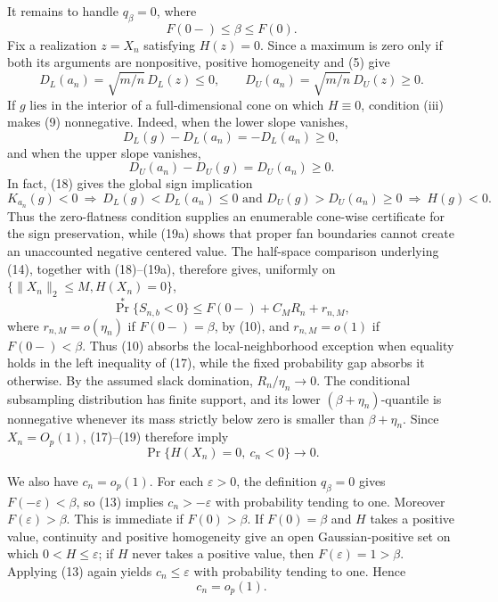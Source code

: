 It remains to handle \(q_\beta=0\), where
\[
F(0-)\leq\beta\leq F(0).
\tag{17}
\]
Fix a realization \(z=X_n\) satisfying \(H(z)=0\).  Since a maximum is zero only if both its arguments are nonpositive, positive homogeneity and (5) give
\[
D_L(a_n)=\sqrt{m/n}\,D_L(z)\leq0,
\qquad
D_U(a_n)=\sqrt{m/n}\,D_U(z)\geq0.
\tag{18}
\]
If \(g\) lies in the interior of a full-dimensional cone on which \(H\equiv0\), condition (iii) makes (9) nonnegative.  Indeed, when the lower slope vanishes,
\[
D_L(g)-D_L(a_n)=-D_L(a_n)\geq0,
\]
and when the upper slope vanishes,
\[
D_U(a_n)-D_U(g)=D_U(a_n)\geq0.
\]
In fact, (18) gives the global sign implication
\[
K_{a_n}(g)<0
\ \Longrightarrow\ D_L(g)<D_L(a_n)\leq0
\text{ and }D_U(g)>D_U(a_n)\geq0
\ \Longrightarrow\ H(g)<0.
\tag{19a}
\]
Thus the zero-flatness condition supplies an enumerable cone-wise certificate for the sign preservation, while (19a) shows that proper fan boundaries cannot create an unaccounted negative centered value.  The half-space comparison underlying (14), together with (18)--(19a), therefore gives, uniformly on \(\{\|X_n\|_2\leq M,H(X_n)=0\}\),
\[
\Pr^*\{S_{n,b}<0\}
\leq F(0-)+C_M R_n+r_{n,M},
\tag{19}
\]
where \(r_{n,M}=o(\eta_n)\) if \(F(0-)=\beta\), by (10), and \(r_{n,M}=o(1)\) if \(F(0-)<\beta\).  Thus (10) absorbs the local-neighborhood exception when equality holds in the left inequality of (17), while the fixed probability gap absorbs it otherwise.  By the assumed slack domination, \(R_n/\eta_n\to0\).  The conditional subsampling distribution has finite support, and its lower \((\beta+\eta_n)\)-quantile is nonnegative whenever its mass strictly below zero is smaller than \(\beta+\eta_n\).  Since \(X_n=O_p(1)\), (17)--(19) therefore imply
\[
\Pr\{H(X_n)=0,\ c_n<0\}\longrightarrow0.
\tag{20}
\]

We also have \(c_n=o_p(1)\).  For each \(\varepsilon>0\), the definition \(q_\beta=0\) gives \(F(-\varepsilon)<\beta\), so (13) implies \(c_n> -\varepsilon\) with probability tending to one.  Moreover \(F(\varepsilon)>\beta\).  This is immediate if \(F(0)>\beta\).  If \(F(0)=\beta\) and \(H\) takes a positive value, continuity and positive homogeneity give an open Gaussian-positive set on which \(0<H\leq\varepsilon\); if \(H\) never takes a positive value, then \(F(\varepsilon)=1>\beta\).  Applying (13) again yields \(c_n\leq\varepsilon\) with probability tending to one.  Hence
\[
c_n=o_p(1).
\tag{21}
\]

